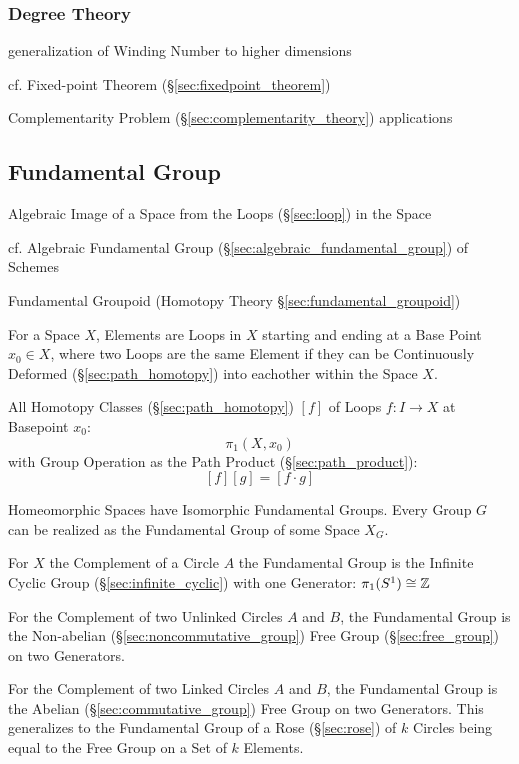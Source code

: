 \subsubsection{Degree Theory}\label{sec:degree_theory}

generalization of Winding Number to higher dimensions

cf. Fixed-point Theorem (\S\ref{sec:fixedpoint_theorem})

Complementarity Problem (\S\ref{sec:complementarity_theory}) applications



\subsection{Fundamental Group}\label{sec:fundamental_group}

Algebraic Image of a Space from the Loops (\S\ref{sec:loop}) in the Space

cf. Algebraic Fundamental Group (\S\ref{sec:algebraic_fundamental_group}) of
Schemes

\fist Fundamental Groupoid (Homotopy Theory \S\ref{sec:fundamental_groupoid})

For a Space $X$, Elements are Loops in $X$ starting and ending at a Base Point
$x_0 \in X$, where two Loops are the same Element if they can be Continuously
Deformed (\S\ref{sec:path_homotopy}) into eachother within the Space $X$.

All Homotopy Classes (\S\ref{sec:path_homotopy}) $[f]$ of Loops $f : I
\rightarrow X$ at Basepoint $x_0$:
\[
  \pi_1(X,x_0)
\]
with Group Operation as the Path Product (\S\ref{sec:path_product}):
\[
  [f][g] = [f \cdot g]
\]

Homeomorphic Spaces have Isomorphic Fundamental Groups. Every Group $G$ can be
realized as the Fundamental Group of some Space $X_G$. \cite{hatcher02}

For $X$ the Complement of a Circle $A$ the Fundamental Group is the Infinite
Cyclic Group (\S\ref{sec:infinite_cyclic}) with one Generator: $\pi_1(S^1) \cong
\mathbb{Z}$

For the Complement of two Unlinked Circles $A$ and $B$, the Fundamental Group is
the Non-abelian (\S\ref{sec:noncommutative_group}) Free Group
(\S\ref{sec:free_group}) on two Generators.

For the Complement of two Linked Circles $A$ and $B$, the Fundamental Group is
the Abelian (\S\ref{sec:commutative_group}) Free Group on two Generators.
\cite{hatcher02} This generalizes to the Fundamental Group of a Rose
(\S\ref{sec:rose}) of $k$ Circles being equal to the Free Group on a Set of $k$
Elements.

